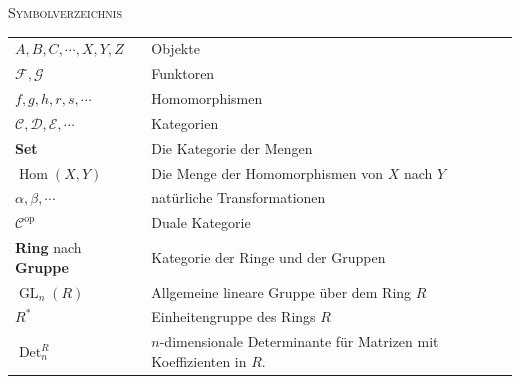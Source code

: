 \documentclass[a4paper]{amsart}
\theoremstyle{definition}
\DeclareMathOperator{\Det}{Det}
\DeclareMathOperator{\Hom}{Hom}
\DeclareMathOperator{\GL}{GL}
\begin{document}
\begin{large}
    \centerline{\textsc{Symbolverzeichnis}}
\end{large}
\bigskip

\renewcommand*{\arraystretch}{1}

\begin{tabular}{ll}
    $A, B, C, \cdots, X, Y, Z$          & Objekte\\
    $\mathcal F,\mathcal G$             & Funktoren\\
    $f, g, h, r, s, \cdots$             & Homomorphismen\\
    $\mathcal C, \mathcal D, \mathcal E, \cdots$ & Kategorien\\
    \textbf{Set}                        & Die Kategorie der Mengen\\
    $\Hom( X, Y)$                       & Die Menge der Homomorphismen von $X$ nach $Y$\\
    $\alpha, \beta, \cdots$             & natürliche Transformationen\\
    $\mathcal C ^{\text{op}}$           & Duale Kategorie\\
    \textbf{Ring} nach \textbf{Gruppe}  & Kategorie der Ringe und der Gruppen\\
    $\GL_n(R)$                          & Allgemeine lineare Gruppe über dem Ring $R$\\
    $R^*$                               & Einheitengruppe des Rings $R$\\
    $\Det_n^R$                          & $n$-dimensionale Determinante für Matrizen mit Koeffizienten in $R$. 
    
\end{tabular}
\end{document}
